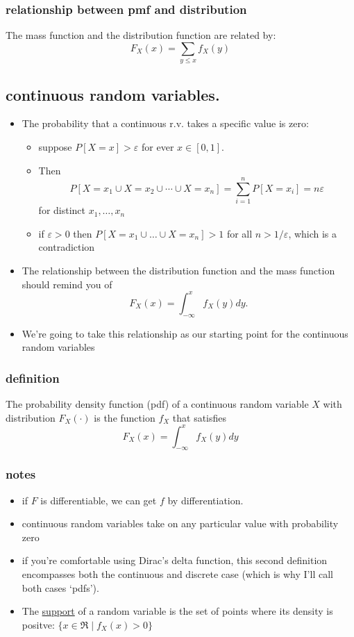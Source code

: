 \documentclass[11pt]{article}
\begin{document}
\subsubsection{relationship between pmf and distribution}
\label{sec-3-2-2}

      The mass function and the distribution function are related by:
      \[F_X(x) = \sum_{y \leq x} f_X(y)\]
\subsection{continuous random variables.}
\label{sec-3-3}

\begin{itemize}
\item The probability that a continuous r.v. takes a specific value
       is zero:
\begin{itemize}
\item suppose $P[X = x] > \varepsilon$ for ever $x \in [0,1]$.
\item Then \[P[X=x_1 \cup X = x_2 \cup \cdots \cup X = x_n] =
         \sum_{i=1}^n P[X = x_i] = n \varepsilon\] for distinct $x_1,\dots,x_n$
\item if $\varepsilon > 0$ then $P[X = x_1 \cup \dots \cup X
         = x_n] > 1$ for all $n > 1/\varepsilon$, which is a contradiction
\end{itemize}
\item The relationship between the distribution function and the mass
       function should remind you of \[ F_X(x) = \int_{ -\infty}^{x}
       f_X(y) dy.\]
\item We're going to take this relationship as our starting point for
       the continuous random variables
\end{itemize}
\subsubsection{definition}
\label{sec-3-3-1}

      The probability density function (pdf) of a continuous random
      variable $X$ with distribution $F_X(\cdot)$ is the function $f_X$
      that satisfies \[ F_X(x) = \int_{-\infty}^{x} f_X(y) dy\]
\subsubsection{notes}
\label{sec-3-3-2}

\begin{itemize}
\item if $F$ is differentiable, we can get $f$ by differentiation.
\item continuous random variables take on any particular value
        with probability zero
\item if you're comfortable using Dirac's delta function, this second
        definition encompasses both the continuous and discrete case
        (which is why I'll call both cases `pdfs').
\item The \underline{support} of a random variable is the set of points where
        its density is positve: $\{x \in \Re \mid f_X(x) > 0\}$
\end{itemize}
\end{document}

